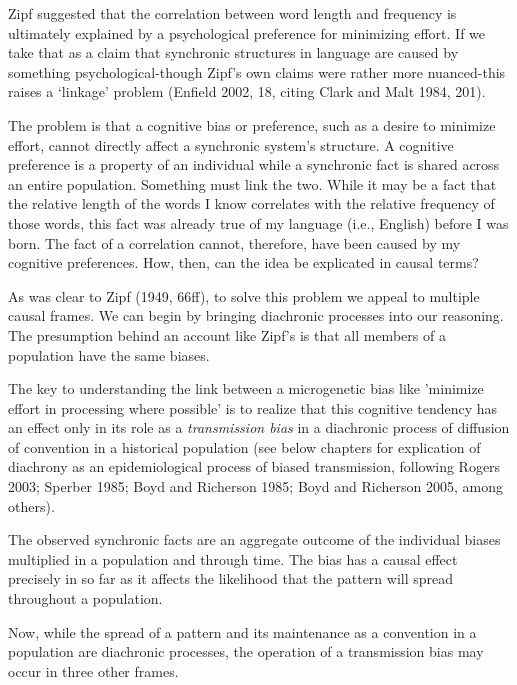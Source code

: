 Zipf suggested that the correlation between word length and frequency is 
ultimately explained by a psychological preference for minimizing 
effort. If we take that as a claim that synchronic structures in 
language are caused by something psychological-though Zipf's own claims 
were rather more nuanced-this raises a \textquoteleft linkage' problem (Enfield 2002, 
18, citing Clark and Malt 1984, 201). 



The problem is that a cognitive bias or preference, such as a desire to 
minimize effort, cannot directly affect a synchronic system's structure. 
A cognitive preference is a property of an individual while a synchronic 
fact is shared across an entire population. Something must link the two. 
While it may be a fact that the relative length of the words I know 
correlates with the relative frequency of those words, this fact was 
already true of my language (i.e., English) before I was born. The fact 
of a correlation cannot, therefore, have been caused by my cognitive 
preferences. How, then, can the idea be explicated in causal terms?



As was clear to Zipf (1949, 66ff), to solve this problem we appeal to 
multiple causal frames. We can begin by bringing diachronic processes 
into our reasoning. The presumption behind an account like Zipf's is 
that all members of a population have the same biases. 



The key to understanding the link between a microgenetic bias like 
'minimize effort in processing where possible' is to realize that this 
cognitive tendency has an effect only in its role as a \textit{
transmission bias} in a diachronic process of diffusion of convention 
in a historical population (see below chapters for explication of 
diachrony as an epidemiological process of biased transmission, 
following Rogers 2003; Sperber 1985; Boyd and Richerson 1985; Boyd and 
Richerson 2005, among others). 



The observed synchronic facts are an aggregate outcome of the individual 
biases multiplied in a population and through time. The bias has a 
causal effect precisely in so far as it affects the likelihood that the 
pattern will spread throughout a population. 



Now, while the spread of a pattern and its maintenance as a convention 
in a population are diachronic processes, the operation of a 
transmission bias may occur in three other frames. 



